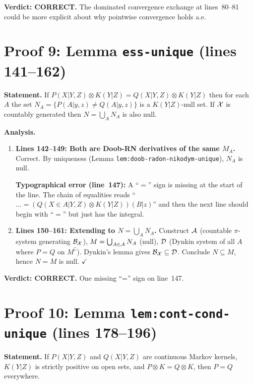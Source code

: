 \documentclass{article}
\begin{document}
\textbf{Verdict: CORRECT.}  The dominated convergence exchange at lines~80--81
could be more explicit about why pointwise convergence holds a.e.

\section{Proof 9: Lemma \texttt{ess-unique} (lines 141--162)}

\textbf{Statement.} If $P(X|Y,Z)\otimes K(Y|Z) = Q(X|Y,Z)\otimes K(Y|Z)$
then for each $A$ the set $N_A=\{P(A|y,z)\neq Q(A|y,z)\}$ is a $K(Y|Z)$-null set.
If $\mathcal{X}$ is countably generated then $N=\bigcup_A N_A$ is also null.

\textbf{Analysis.}
\begin{enumerate}[leftmargin=*]
  \item \textbf{Lines 142--149: Both are Doob-RN derivatives of the same $M_A$.}
    Correct.  By uniqueness (Lemma \texttt{lem:doob-radon-nikodym-unique}), $N_A$ is null.

    \textbf{Typographical error (line~147):} A ``$=$'' sign is missing at the
    start of the line.  The chain of equalities reads
    ``$\ldots = (Q(X\in A|Y,Z)\otimes K(Y|Z))(B|z)$'' and then the next line
    should begin with ``$=$'' but just has the integral.

  \item \textbf{Lines 150--161: Extending to $N=\bigcup_A N_A$.}
    Construct $\mathcal{A}$ (countable $\pi$-system generating $\mathcal{B}_{\mathcal{X}}$),
    $M=\bigcup_{A\in\mathcal{A}}N_A$ (null), $\mathcal{D}$ (Dynkin system of all $A$
    where $P=Q$ on $M^\complement$).  Dynkin's lemma gives $\mathcal{B}_{\mathcal{X}}\subseteq\mathcal{D}$.
    Conclude $N\subseteq M$, hence $N=M$ is null.  $\checkmark$
\end{enumerate}

\textbf{Verdict: CORRECT.}  One missing ``='' sign on line~147.

\section{Proof 10: Lemma \texttt{lem:cont-cond-unique} (lines 178--196)}

\textbf{Statement.} If $P(X|Y,Z)$ and $Q(X|Y,Z)$ are continuous Markov kernels,
$K(Y|Z)$ is strictly positive on open sets, and $P\otimes K = Q\otimes K$,
then $P=Q$ everywhere.
\end{document}
